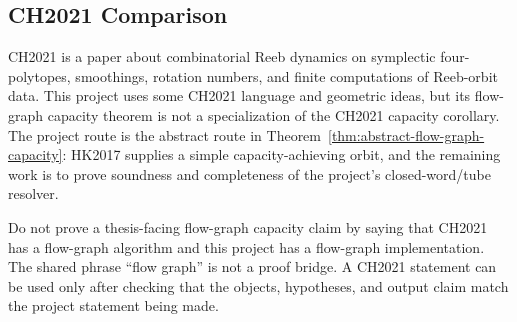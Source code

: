 %
%
%
%


\subsection{CH2021 Comparison}
\label{sec:flow-graph-ch2021-comparison}

CH2021 is a paper about combinatorial Reeb dynamics on symplectic
four-polytopes, smoothings, rotation numbers, and finite computations of
Reeb-orbit data.  This project uses some CH2021 language and geometric ideas,
but its flow-graph capacity theorem is not a specialization of the CH2021
capacity corollary.  The project route is the abstract route in
Theorem~\ref{thm:abstract-flow-graph-capacity}: HK2017 supplies a simple
capacity-achieving orbit, and the remaining work is to prove soundness and
completeness of the project's closed-word/tube resolver.

\begin{remark}\label{rem:ch2021-non-transfer-rule}
Do not prove a thesis-facing flow-graph capacity claim by saying that CH2021 has
a flow-graph algorithm and this project has a flow-graph implementation.  The
shared phrase ``flow graph'' is not a proof bridge.  A CH2021 statement can be
used only after checking that the objects, hypotheses, and output claim match
the project statement being made.
\end{remark}

